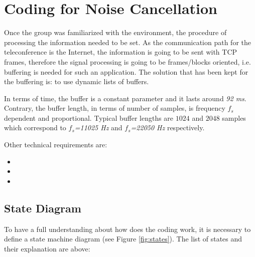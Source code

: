 \documentclass[11pt,a4paper,english]{book}  %
\theoremstyle{definition}  %
\theoremstyle{plain}  %
\theoremstyle{remark}  %
\begin{document}
\section{Coding for Noise Cancellation}
\label{sec:coding}

Once the group was familiarized with the environment, the procedure of processing the information needed to be set. As the communication path for the teleconference is the Internet, the information is going to be sent with TCP frames, therefore the signal processing is going to be frames/blocks oriented, i.e. buffering is needed for such an application. The solution that has been kept for the buffering is: to use dynamic lists of buffers.

In terms of time, the buffer is a constant parameter and it lasts around \textit{92 ms}. Contrary, the buffer length, in terms of number of samples, is frequency $f_{s}$ dependent and proportional. Typical buffer lengths are $1024$ and $2048$ samples which correspond to \textit{$f_{s}$=11025 Hz} and \textit{$f_{s}$=22050 Hz} respectively.

Other technical requirements are:

\begin{itemize}
\item
\item
\item
\end{itemize}


	\subsection{State Diagram}
	
	To have a full understanding about how does the coding work, it is necessary to define a state machine diagram (see Figure \ref{fig:states}). The list of states and their explanation are above:
	
\end{document}
